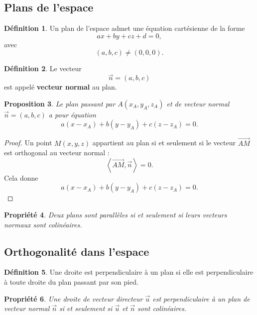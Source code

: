 \documentclass[11pt,a4paper]{article}
\newcommand{\ps}[2]{\left\langle #1,#2\right\rangle}
\newcommand{\uu}{\overrightarrow{u}}
\theoremstyle{definition}
\newtheorem{definition}{Définition}[section]
\theoremstyle{plain}
\newtheorem{propriete}[definition]{Propriété}
\newtheorem{proposition}[definition]{Proposition}
\begin{document}
\subsection{Plans de l'espace}

\begin{definition}
Un plan de l'espace admet une équation cartésienne de la forme
\[
ax+by+cz+d=0,
\]
avec
\[
(a,b,c)\neq(0,0,0).
\]
\end{definition}

\begin{definition}
Le vecteur
\[
\overrightarrow{n}=(a,b,c)
\]
est appelé \textbf{vecteur normal} au plan.
\end{definition}

\begin{proposition}
Le plan passant par $A(x_A,y_A,z_A)$ et de vecteur normal $\overrightarrow{n}=(a,b,c)$ a pour équation
\[
a(x-x_A)+b(y-y_A)+c(z-z_A)=0.
\]
\end{proposition}

\begin{proof}
Un point $M(x,y,z)$ appartient au plan si et seulement si le vecteur $\overrightarrow{AM}$ est orthogonal au vecteur normal :
\[
\ps{\overrightarrow{AM}}{\overrightarrow{n}}=0.
\]
Cela donne
\[
a(x-x_A)+b(y-y_A)+c(z-z_A)=0.
\]
\end{proof}

\begin{propriete}
Deux plans sont parallèles si et seulement si leurs vecteurs normaux sont colinéaires.
\end{propriete}

\subsection{Orthogonalité dans l'espace}

\begin{definition}
Une droite est perpendiculaire à un plan si elle est perpendiculaire à toute droite du plan passant par son pied.
\end{definition}

\begin{propriete}
Une droite de vecteur directeur $\uu$ est perpendiculaire à un plan de vecteur normal $\overrightarrow{n}$ si et seulement si $\uu$ et $\overrightarrow{n}$ sont colinéaires.
\end{propriete}
\end{document}
